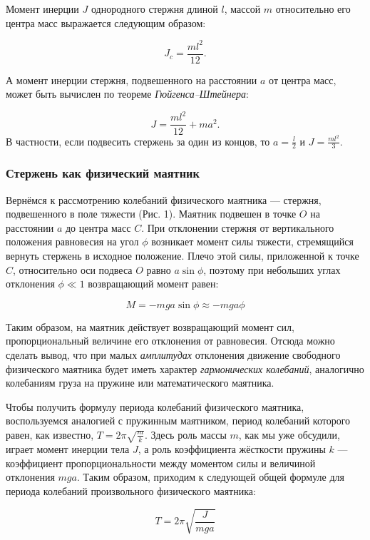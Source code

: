 \documentclass[12pt, a4paper]{article}
\begin{document}
Момент инерции $J$ однородного стержня длиной $l$, массой $m$ относительно
его центра масс выражается следующим образом:

\[J_c = \frac{ml^2}{12}.\]

А момент инерции стержня, подвешенного на расстоянии $a$ от центра масс,
может быть вычислен по теореме \textit{Гюйгенса–Штейнера}:

\begin{equation}
    J = \frac{ml^2}{12} + ma^2.
\end{equation}
В частности, если подвесить стержень за один из концов, то
$a = \frac{l}{2}$ и $J = \frac{ml^2}{3}$.

\subsubsection*{Стержень как физический маятник}

Вернёмся к рассмотрению колебаний физического маятника —
стержня, подвешенного в поле тяжести (Рис. 1). Маятник подвешен в
точке $O$ на расстоянии $a$ до центра масс $C$. При отклонении стержня от
вертикального положения равновесия на угол $\phi$ возникает момент силы
тяжести, стремящийся вернуть стержень в исходное положение. Плечо этой
силы, приложенной к точке $C$, относительно оси подвеса $O$ равно
$a\sin{\phi}$, поэтому при небольших углах отклонения $\phi \ll 1 $
возвращающий момент равен:

\[M = -mga\sin{\phi} \approx -mga\phi\]

Таким образом, на маятник действует возвращающий момент
\newline
сил, пропорциональный
величине его отклонения от равновесия. Отсюда можно сделать вывод, что при
малых \textit{амплитудах} отклонения движение свободного физического маятника
будет иметь характер \textit{гармонических колебаний}, аналогично колебаниям
груза на пружине или математического маятника. 

Чтобы получить формулу периода колебаний физического маятника,
воспользуемся аналогией с пружинным маятником, период колебаний которого
равен, как известно, $T = 2\pi\sqrt{\frac{m}{k}}$. Здесь роль массы $m$,
как мы уже обсудили, играет момент инерции тела $J$, а роль коэффициента
жёсткости пружины $k$ — коэффициент пропорциональности между моментом силы и
величиной отклонения $mga$. Таким образом, приходим к следующей общей формуле
для периода колебаний произвольного физического маятника:

\begin{equation}
    T = 2\pi\sqrt{\frac{J}{mga}}
\end{equation}
\end{document}
